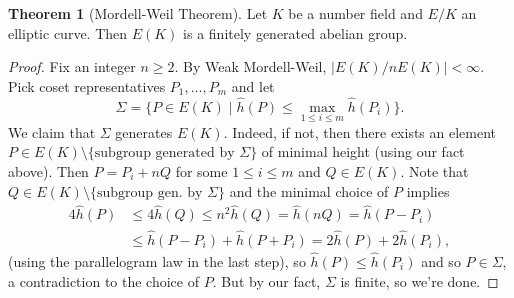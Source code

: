 \documentclass{article}
\theoremstyle{definition}
\newtheorem{theorem}{Theorem}[section]
\begin{document}
\begin{theorem}[Mordell-Weil Theorem]\label{theorem12.3}
    Let $K$ be a number field and $E/K$ an elliptic curve. Then $E(K)$ is a finitely generated abelian group.
\end{theorem}
\begin{proof}
    Fix an integer $n\ge 2$. By Weak Mordell-Weil, $\left|E(K)/nE(K)\right|<\infty$. Pick coset representatives $P_1,\ldots,P_m$ and let $$\Sigma = \{P \in E(K) \mid \widehat{h}(P)\le \max_{1\le i\le m}\widehat{h}(P_i)\}.$$ We claim that $\Sigma$ generates $E(K)$. Indeed, if not, then there exists an element $P \in E(K)\setminus \{\text{subgroup generated by }\Sigma\}$ of minimal height (using our fact above). Then $P = P_i + nQ$ for some $1\le i\le m$ and $Q \in E(K)$. Note that $Q \in E(K)\setminus \{\text{subgroup gen. by }\Sigma\}$ and the minimal choice of $P$ implies 
    \begin{align*}
        4\hat{h}(P)&\le 4\hat{h}(Q)\le n^2 \hat{h}(Q) =\hat{h}(nQ) = \hat{h}(P-P_i)\\
        &\le \hat{h}(P-P_i)+\hat{h}(P+P_i) = 2\hat{h}(P) + 2\hat{h}(P_i),
    \end{align*}
    (using the parallelogram law in the last step), so $\hat{h}(P)\le \hat{h}(P_i)$ and so $P \in \Sigma$, a contradiction to the choice of $P$. But by our fact, $\Sigma$ is finite, so we're done.
\end{proof}
\end{document}
